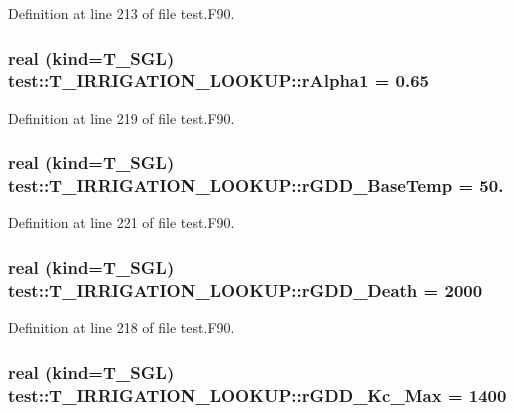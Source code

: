 Definition at line 213 of file test.F90.

\hypertarget{typetest_1_1_t___i_r_r_i_g_a_t_i_o_n___l_o_o_k_u_p_a6bb03e3c8350cf0504b69bd651ed7ddb}{
\subsubsection[{rAlpha1}]{\setlength{\rightskip}{0pt plus 5cm}real (kind={\bf T\_\-SGL}) {\bf test::T\_\-IRRIGATION\_\-LOOKUP::rAlpha1} = 0.65}}
\label{typetest_1_1_t___i_r_r_i_g_a_t_i_o_n___l_o_o_k_u_p_a6bb03e3c8350cf0504b69bd651ed7ddb}


Definition at line 219 of file test.F90.

\hypertarget{typetest_1_1_t___i_r_r_i_g_a_t_i_o_n___l_o_o_k_u_p_a10ac6c0415db9e72919d277e45694bf7}{
\subsubsection[{rGDD\_\-BaseTemp}]{\setlength{\rightskip}{0pt plus 5cm}real (kind={\bf T\_\-SGL}) {\bf test::T\_\-IRRIGATION\_\-LOOKUP::rGDD\_\-BaseTemp} = 50.}}
\label{typetest_1_1_t___i_r_r_i_g_a_t_i_o_n___l_o_o_k_u_p_a10ac6c0415db9e72919d277e45694bf7}


Definition at line 221 of file test.F90.

\hypertarget{typetest_1_1_t___i_r_r_i_g_a_t_i_o_n___l_o_o_k_u_p_ad7f07fb9dff3499b6b708f9d8e6f7f53}{
\subsubsection[{rGDD\_\-Death}]{\setlength{\rightskip}{0pt plus 5cm}real (kind={\bf T\_\-SGL}) {\bf test::T\_\-IRRIGATION\_\-LOOKUP::rGDD\_\-Death} = 2000}}
\label{typetest_1_1_t___i_r_r_i_g_a_t_i_o_n___l_o_o_k_u_p_ad7f07fb9dff3499b6b708f9d8e6f7f53}


Definition at line 218 of file test.F90.

\hypertarget{typetest_1_1_t___i_r_r_i_g_a_t_i_o_n___l_o_o_k_u_p_a5751f8a4d4700dd9b4f112a7d7281554}{
\subsubsection[{rGDD\_\-Kc\_\-Max}]{\setlength{\rightskip}{0pt plus 5cm}real (kind={\bf T\_\-SGL}) {\bf test::T\_\-IRRIGATION\_\-LOOKUP::rGDD\_\-Kc\_\-Max} = 1400}}
\label{typetest_1_1_t___i_r_r_i_g_a_t_i_o_n___l_o_o_k_u_p_a5751f8a4d4700dd9b4f112a7d7281554}


